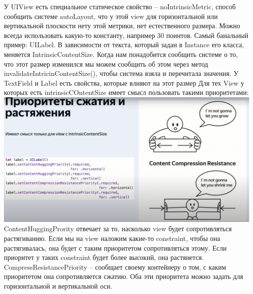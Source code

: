 \documentclass{article}
\begin{document}
    \newline
    У UIView есть специальное статическое свойство -- noIntrinsicMetric, способ сообщить системе autoLayout, что у этой view для горизонтальной или вертикальной плоскости нету этой метрики, нет естественного размера. 
    \newline
    Можно всегда использовать какую-то константу, например 30 поинтов. 
    \newline
    Самый банальный пример: UILabel. В зависимости от текста, который задан в Instance его класса, меняется IntrinsicContentSize.
    \newline
    Когда нам понадобится сообщить системе о то, что этот размер изменился мы можем сообщить об этом через метод invalidateIntricinContentSize(), чтобы система взяла и перечитала значения. У TextField и Label есть свойства, которые влияют на этот размер
    \newline
    Для тех View у которых есть intrinsicCOntentSize имеет смысл пользовать такими приоритетами: 
    \newline
    \includegraphics[scale = 0.2]{pic/Снимок экрана 2023-07-31 в 22.27.28.png}
    \newline
    ContentHuggingPrority отвечает за то, насколько view будет сопротивляться растягиванию. Если мы на view наложим какие-то constraint, чтобы она растягивалась, она будет с таким приоритетом сопротивляться этому. Если приоритет у таких constraint будет более высокий, она растянется. 
    \newline
    CompressResistancePriority -- сообщает своему контейнеру о том, с каким приоритетом она сопротивляется сжатию. Оба эти приоритета можно задать для горизонтальной и вертикальной оси. 
\end{document}
